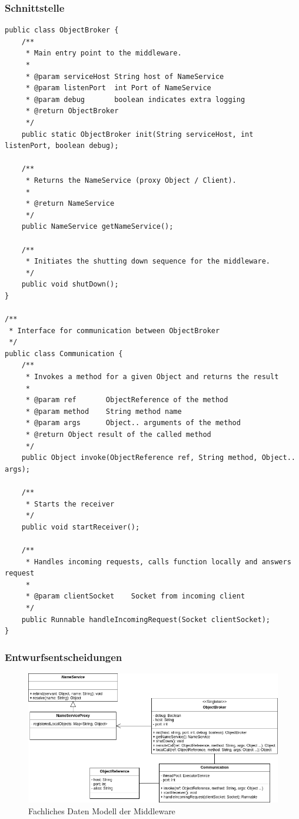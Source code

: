 \documentclass{article}
\begin{document}
\subsubsection{Schnittstelle}
\begin{lstlisting}
public class ObjectBroker {
    /**
     * Main entry point to the middleware.
     *
     * @param serviceHost String host of NameService
     * @param listenPort  int Port of NameService
     * @param debug       boolean indicates extra logging
     * @return ObjectBroker
     */
    public static ObjectBroker init(String serviceHost, int listenPort, boolean debug);

    /**
     * Returns the NameService (proxy Object / Client).
     *
     * @return NameService
     */
    public NameService getNameService();

    /**
     * Initiates the shutting down sequence for the middleware.
     */
    public void shutDown();
}

/**
 * Interface for communication between ObjectBroker
 */
public class Communication {
    /**
     * Invokes a method for a given Object and returns the result
     *
     * @param ref       ObjectReference of the method
     * @param method    String method name
     * @param args      Object.. arguments of the method
     * @return Object result of the called method
     */
    public Object invoke(ObjectReference ref, String method, Object.. args);

    /**
     * Starts the receiver
     */
    public void startReceiver();

    /**
     * Handles incoming requests, calls function locally and answers request
     *
     * @param clientSocket    Socket from incoming client
     */
    public Runnable handleIncomingRequest(Socket clientSocket);
}
\end{lstlisting}

\subsubsection{Entwurfsentscheidungen}
\begin{figure}[H]
    \centering
    \includegraphics[width=\textwidth]{Middleware_FDM.png}
    \caption[fdm-middleware]{Fachliches Daten Modell der Middleware}
    \label{fig:fdm-middleware}
\end{figure}
\end{document}
